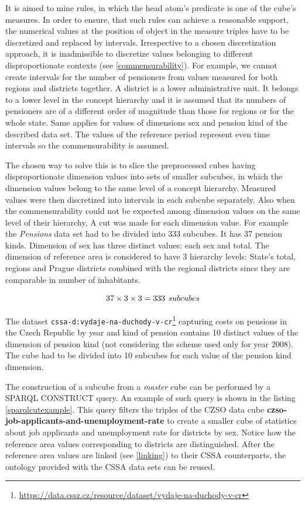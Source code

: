 It is aimed to mine rules, in which the head atom's predicate is one of the cube's measures. In order to ensure, that such rules can achieve a reasonable support, the numerical values at the position of object in the measure triples have to be discretized and replaced by intervals. Irrespective to a chosen discretization approach, it is inadmissible to discretize values belonging to different disproportionate contexts (see \ref{commensurability}). For example, we cannot create intervals for the number of pensioners from values measured for both regions and districts together. A district is a lower administrative unit. It belongs to a lower level in the concept hierarchy and it is assumed that its numbers of pensioners are of a different order of magnitude than those for regions or for the whole state. Same applies for values of dimensions sex and pension kind of the described data set. The values of the reference period represent even time intervals so the commensurability is assumed.

The chosen way to solve this is to slice the preprocessed cubes having disproportionate dimension values into sets of smaller subcubes, in which the dimension values belong to the same level of a concept hierarchy. Measured values were then discretized into intervals in each subcube separately. Also when the commensurability could not be expected among dimension values on the same level of their hierarchy, A cut was made for each dimension value. For example the \textit{Pensions} data set had to be divided into 333 subcubes. It has 37 pension kinds. Dimension of sex has three distinct values: each sex and total. The dimension of reference area is considered to have 3 hierarchy levels: State's total, regions and Prague districts combined with the regional districts since they are comparable in number of inhabitants.

$$
37 \times 3 \times 3 = 333\hspace{0.4em}subcubes
$$

The dataset \verb|cssa-d:vydaje-na-duchody-v-cr|\footnote{\href{https://data.cssz.cz/resource/dataset/vydaje-na-duchody-v-cr}{https://data.cssz.cz/resource/dataset/vydaje-na-duchody-v-cr}} capturing costs on pensions in the Czech Republic by year and kind of pension contains 10 distinct values of the dimension of pension kind (not considering the scheme used only for year 2008). The cube had to be divided into 10 subcubes for each value of the pension kind dimension.

The construction of a subcube from a \textit{master} cube can be performed by a SPARQL CONSTRUCT query. An example of such query is shown in the listing \ref{sparqlcutexample}. This query filters the triples of the CZSO data cube \textbf{czso-job-applicants-and-unemployment-rate} to create a smaller cube of statistics about job applicants and unemployment rate for districts by sex. Notice how the reference area values corresponding to districts are distinguished. After the reference area values are linked (see \ref{linking}) to their CSSA counterparts, the ontology provided with the CSSA data sets can be reused.

